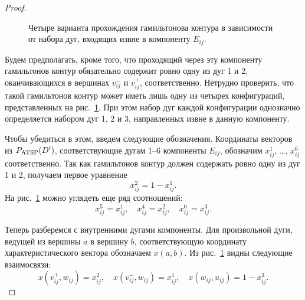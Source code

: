 \begin{proof}
\begin{figure}
	\hspace*{\fill}
	
	\caption{Четыре варианта прохождения гамильтонова контура в зависимости от набора дуг, входящих извне в компоненту $E_{ij}$.}
	\label{fig:BQP2ATSP-2}
\end{figure}
	
	Будем предполагать, кроме того, что проходящий через эту компоненту гамильтонов контур обязательно содержит ровно одну из дуг 1 и 2, оканчивающихся в вершинах $v^-_{ij}$ и $v^+_{ij}$, соответственно.
	Нетрудно проверить, что такой гамильтонов контур может иметь лишь одну из четырех конфигураций, представленных на рис.~\ref{fig:BQP2ATSP-2}.
	При этом набор дуг каждой конфигурации однозначно определяется набором дуг 1, 2 и 3, направленных извне в данную компоненту.
	
	Чтобы убедиться в этом, введем следующие обозначения.
	Координаты векторов из $P_{\textup{ATSP}}(D')$, соответствующие дугам 1--6 компоненты $E_{ij}$, обозначим $x^1_{ij}$, \ldots, $x^6_{ij}$ соответственно.
	Так как гамильтонов контур должен содержать ровно одну из дуг 1 и 2, получаем первое уравнение
	\begin{equation}
	\label{lin1}
	x^2_{ij} = 1 - x^1_{ij}.
	\end{equation}
	На рис.~\ref{fig:BQP2ATSP-2} можно углядеть еще ряд соотношений:
	\begin{equation}
	\label{lin2}
	x^5_{ij} = x^1_{ij}, \quad x^4_{ij} = x^2_{ij}, \quad x^6_{ij} = x^3_{ij}.
	\end{equation}
	
	Теперь разберемся с внутренними дугами компоненты.
	Для произвольной дуги, ведущей из вершины $a$ в вершину $b$,
	соответствующую координату характеристического вектора обозначаем $x(a,b)$.
	Из рис.~\ref{fig:BQP2ATSP-2} видны следующие взаимосвязи:
	\newcommand{\oo}[1]{\left(#1\right)}
	\begin{equation}
	\label{lin3}
	x\oo{v^+_{ij}, w_{ij}} = x^2_{ij}, \quad 
	x\oo{v^-_{ij}, w_{ij}} = x^1_{ij}, \quad 
	x\oo{  w_{ij}, u_{ij}} = 1 - x^3_{ij}.
	\end{equation}
	

\end{proof}

